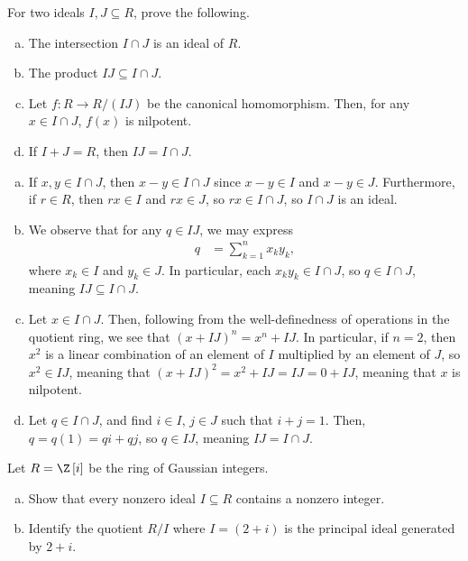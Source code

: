 \documentclass[10pt]{mypackage}
\begin{document}
\RaggedRight
\begin{problem}[Problem 1]
  For two ideals $I,J\subseteq R$, prove the following.
  \begin{enumerate}[(a)]
    \item The intersection $I\cap J$ is an ideal of $R$.
    \item The product $IJ\subseteq I\cap J$.
    \item Let $f\colon R\rightarrow R/(IJ)$ be the canonical homomorphism. Then, for any $x\in I\cap J$, $f(x)$ is nilpotent.
    \item If $I + J = R$, then $IJ = I\cap J$.
  \end{enumerate}
\end{problem}
\begin{solution}\hfill
  \begin{enumerate}[(a)]
    \item If $x,y\in I\cap J$, then $x - y\in I\cap J$ since $x-y\in I$ and $x-y\in J$. Furthermore, if $r\in R$, then $rx\in I$ and $rx\in J$, so $rx\in I\cap J$, so $I\cap J$ is an ideal.
    \item We observe that for any $q\in IJ$, we may express
      \begin{align*}
        q &= \sum_{k=1}^{n}x_ky_k,
      \end{align*}
      where $x_k\in I$ and $y_k\in J$. In particular, each $x_ky_k\in I\cap J$, so $q\in I\cap J$, meaning $IJ\subseteq I\cap J$.
    \item Let $x\in I\cap J$. Then, following from the well-definedness of operations in the quotient ring, we see that $\left( x+IJ \right)^{n} = x^{n} + IJ$. In particular, if $n = 2$, then $x^2$ is a linear combination of an element of $I$ multiplied by an element of $J$, so $x^2\in IJ$, meaning that $\left( x + IJ \right)^{2} = x^2 + IJ = IJ = 0 + IJ$, meaning that $x$ is nilpotent.
    \item Let $q\in I\cap J$, and find $i\in I$, $j\in J$ such that $i + j = 1$. Then, $q = q(1) = qi + qj$, so $q\in IJ$, meaning $IJ = I\cap J$.
  \end{enumerate}
\end{solution}
\begin{problem}[Problem 3]
  Let $R = \Z\left[ i \right]$ be the ring of Gaussian integers.
  \begin{enumerate}[(a)]
    \item Show that every nonzero ideal $I\subseteq R$ contains a nonzero integer.
    \item Identify the quotient $R/I$ where $I = \left( 2+i \right)$ is the principal ideal generated by $2 + i$.
  \end{enumerate}
\end{problem}
\end{document}

